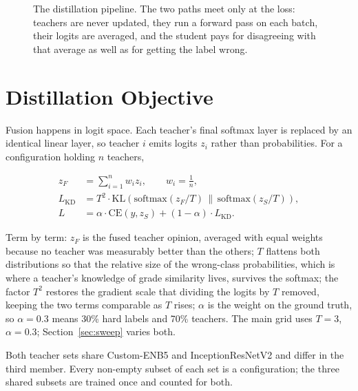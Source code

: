 \documentclass[10pt,letterpaper]{article}
\begin{document}
\begin{figure}[H]
\centering
\resizebox{\textwidth}{!}{}
\caption{The distillation pipeline. The two paths meet only at the loss: teachers are never updated, they
run a forward pass on each batch, their logits are averaged, and the student pays for disagreeing with that
average as well as for getting the label wrong.}
\end{figure}
\FloatBarrier

\section{Distillation Objective}
Fusion happens in logit space. Each teacher's final softmax layer is replaced by an identical linear layer,
so teacher $i$ emits logits $z_i$ rather than probabilities. For a configuration holding $n$ teachers,

\begin{align}
z_F &= \sum_{i=1}^{n} w_i z_i, \qquad w_i = \tfrac{1}{n}, \\
L_{\mathrm{KD}} &= T^2 \cdot \mathrm{KL}\!\left(\mathrm{softmax}(z_F/T)\,\big\|\,\mathrm{softmax}(z_S/T)\right), \\
L &= \alpha \cdot \mathrm{CE}(y, z_S) + (1-\alpha) \cdot L_{\mathrm{KD}}.
\end{align}

Term by term: $z_F$ is the fused teacher opinion, averaged with equal weights because no teacher was
measurably better than the others; $T$ flattens both distributions so that the relative size of the wrong-class
probabilities, which is where a teacher's knowledge of grade similarity lives, survives the softmax; the
factor $T^2$ restores the gradient scale that dividing the logits by $T$ removed, keeping the two terms
comparable as $T$ rises; $\alpha$ is the weight on the ground truth, so $\alpha=0.3$ means 30\% hard labels
and 70\% teachers. The main grid uses $T=3$, $\alpha=0.3$; Section~\ref{sec:sweep} varies both.

Both teacher sets share Custom-ENB5 and InceptionResNetV2 and differ in the third member. Every non-empty
subset of each set is a configuration; the three shared subsets are trained once and counted for both.
\end{document}
